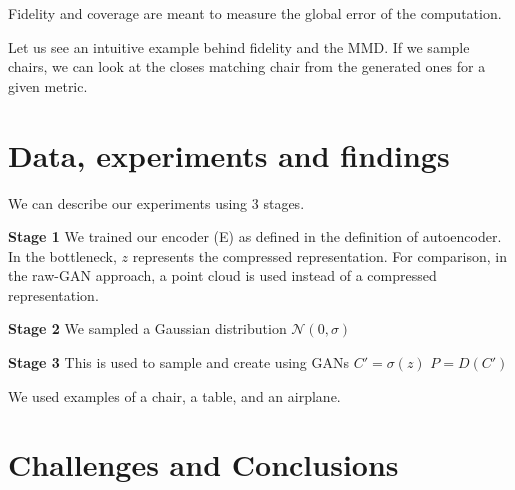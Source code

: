 \documentclass[12pt]{article}
\newcommand{\contentdescription}[1]{}
\begin{document}
    Fidelity and coverage are meant to measure the global error of the computation.

    Let us see an intuitive example behind fidelity and the MMD.
    If we sample chairs, we can look at the closes matching chair from the generated ones for a given metric.


    \section{Data, experiments and findings}
    \contentdescription{
        Data, experiments and findings (30-40\%):

        Describe the data you are working with for your project.
        What type of data is it?
        Where did it come from?
        How much data are you working with?
        Did you have to do any preprocessing, filtering, or other special treatment to use this data in your project?
        Describe and present the experiments that you performed and what is the reason for those experiments.
        Where applicable define evaluation metrics that you used. Discuss the results that you got.
    }

    We can describe our experiments using 3 stages.

    \textbf{Stage 1}
    We trained our encoder (E) as defined in the definition of autoencoder.
    In the bottleneck, $z$ represents the compressed representation.
    For comparison, in the raw-GAN approach, a point cloud is used instead of a compressed representation.

    \textbf{Stage 2}
    We sampled a Gaussian distribution $\mathcal{N}(0,\sigma)$

    \textbf{Stage 3}
    This is used to sample and create using GANs
    $C' = \sigma(z)$
    $P = D(C')$

    We used examples of a chair, a table, and an airplane.

    \section{Challenges and Conclusions}
    \contentdescription{
        Challenges and Conclusions (5-15\%):
        Challenges you faced when reimplementing the paper and conducting the experiments.
        Were all details in the paper?
        Or did you have to look in the authors code or even contact them to find about some details?
        Was parts of the code quite hard to get them to work as intended?
        Did you have optimize and tune several hyperparameters?
        Which ones?
        Did the framework you used make the implementation difficult in some ways?

        Summarize your key results - what have you learned?
        What points do you think one should consider when using the approach of the paper you chose for your project?
        Suggest ideas for future extensions or new applications of your ideas.
    }
\end{document}
